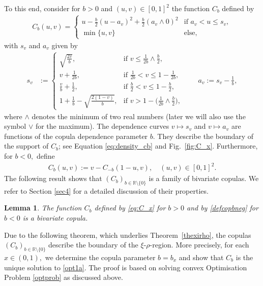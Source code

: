 \documentclass{article}
\theoremstyle{plain}
\newtheorem{lemma}{Lemma}
\theoremstyle{definition}
\newcommand{\R}{\mathbb{R}}
\begin{document}
To this end, consider for $b>0$ and $(u,v)\in[0,1]^2$ the function \(C_b\) defined by
\begin{align}\label{eq:C_x}
    C_b(u,v) = \begin{cases}
        u - \frac{b}{2} (u-a_v)^2 + \frac{b}{2} (a_v\wedge 0)^2 & \text{if } a_v < u \leq s_v,\\
        \min\{u,v\} & \text{else},
    \end{cases}
\end{align}
with \(s_v\) and \(a_v\) given by
\begin{align}
\label{eq:s_v}
  s_{v} &:=
\begin{cases}
\displaystyle
\sqrt{\tfrac{2v}b},
& \text{if } v \le \frac{1}{2b}\wedge\frac{b}{2}, \\
v+\frac{1}{2b}, & \text{if } \frac{1}{2b} < v \le 1-\frac{1}{2b}, \\
\frac{v}b+\frac{1}{2},
& \text{if } \frac{b}{2} < v \le 1-\frac{b}{2}, \\
1+\tfrac1b-\sqrt{\tfrac{2(1-v)}b},
& \text{if } v > 1 - \bigl(\frac{1}{2b} \wedge \frac{b}{2}\bigr),
\end{cases}
\qquad
a_v := s_v - \tfrac 1b,
\end{align}
where \(\wedge\) denotes the minimum of two real numbers (later we will also use the symbol \(\vee\) for the maximum).
The dependence curves \(v\mapsto s_v\) and \(v\mapsto a_v\) are functions of the copula dependence parameter \(b\). They describe the boundary of the support of \(C_b\); see Equation \eqref{eq:density_cb} and Fig.~\ref{fig:C_x}.
Furthermore, for $b<0,$ define
\begin{align}\label{defcopbneg}
     C_b(u,v) := v - C_{-b}(1-u,v), \quad (u,v)\in [0,1]^2.
\end{align}
The following result shows that \((C_b)_{b\in {\mathbb{R}}\setminus\{0\}}\) is a family of bivariate copulas. We refer to Section \ref{sec4} for a detailed discussion of their properties.

\begin{lemma}\label{lemCbcop}
    The function \(C_b\) defined by \eqref{eq:C_x} for \(b>0\) and by \eqref{defcopbneg} for \(b<0\) is a bivariate copula. 
\end{lemma}

Due to the following theorem, which underlies Theorem~\ref{thexirho}, the copulas \((C_b)_{b\in\R\setminus\{0\}}\) describe the boundary of the \(\xi\)-\(\rho\)-region.
More precisely, for each \(x\in (0,1),\) we determine the copula parameter \(b=b_x\) and show that \(C_b\) is the unique solution to \eqref{opt1a}.
The proof is based on solving convex Optimisation Problem \ref{optprob} as discussed above.
\end{document}
